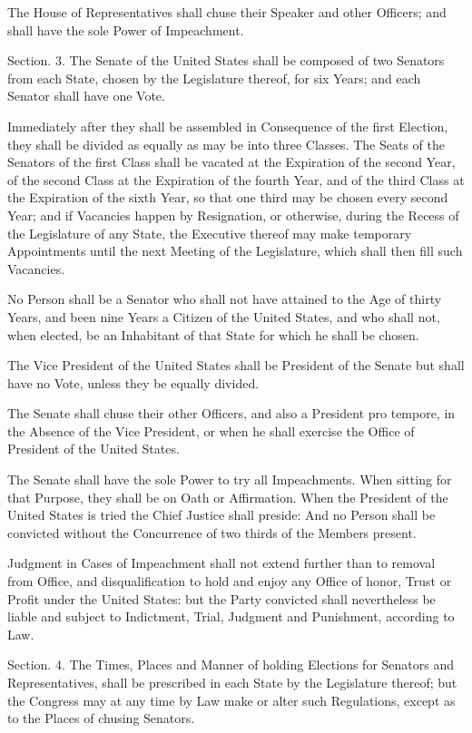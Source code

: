\documentclass{article}
\begin{document}
The House of Representatives shall chuse their Speaker and other Officers; and
shall have the sole Power of Impeachment.


Section. 3.  The Senate of the United States shall be composed of two Senators
from each State, chosen by the Legislature thereof, for six Years; and each
Senator shall have one Vote.

Immediately after they shall be assembled in Consequence of the first Election,
they shall be divided as equally as may be into three Classes. The Seats of the
Senators of the first Class shall be vacated at the Expiration of the second
Year, of the second Class at the Expiration of the fourth Year, and of the third
Class at the Expiration of the sixth Year, so that one third may be chosen every
second Year; and if Vacancies happen by Resignation, or otherwise, during the
Recess of the Legislature of any State, the Executive thereof may make temporary
Appointments until the next Meeting of the Legislature, which shall then fill
such Vacancies.

No Person shall be a Senator who shall not have attained to the Age of thirty
Years, and been nine Years a Citizen of the United States, and who shall not,
when elected, be an Inhabitant of that State for which he shall be chosen.

The Vice President of the United States shall be President of the Senate but
shall have no Vote, unless they be equally divided.

The Senate shall chuse their other Officers, and also a President pro tempore,
in the Absence of the Vice President, or when he shall exercise the Office of
President of the United States.

The Senate shall have the sole Power to try all Impeachments. When sitting for
that Purpose, they shall be on Oath or Affirmation. When the President of the
United States is tried the Chief Justice shall preside: And no Person shall be
convicted without the Concurrence of two thirds of the Members present.

Judgment in Cases of Impeachment shall not extend further than to removal from
Office, and disqualification to hold and enjoy any Office of honor, Trust or
Profit under the United States: but the Party convicted shall nevertheless be
liable and subject to Indictment, Trial, Judgment and Punishment, according to
Law.


Section. 4.  The Times, Places and Manner of holding Elections for Senators and
Representatives, shall be prescribed in each State by the Legislature thereof;
but the Congress may at any time by Law make or alter such Regulations, except
as to the Places of chusing Senators.
\end{document}
